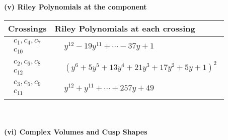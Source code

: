 \documentclass[1p]{elsarticle_modified}
\theoremstyle{definition}
\begin{document}
\newpage\renewcommand{\arraystretch}{1}
\flushleft \textbf{(v) Riley Polynomials at the component}\newline \\
\begin{tabular}{m{50pt}|m{274pt}}
Crossings & \hspace{64pt}Riley Polynomials at each crossing \\
\hline $$\begin{aligned}c_{1},c_{4},c_{7}\\c_{10}\end{aligned}$$&$\begin{aligned}
&y^{12}-19 y^{11}+\cdots-37 y+1
\end{aligned}$\\
\hline $$\begin{aligned}c_{2},c_{6},c_{8}\\c_{12}\end{aligned}$$&$\begin{aligned}
&(y^6+5 y^5+13 y^4+21 y^3+17 y^2+5 y+1)^2
\end{aligned}$\\
\hline $$\begin{aligned}c_{3},c_{5},c_{9}\\c_{11}\end{aligned}$$&$\begin{aligned}
&y^{12}+y^{11}+\cdots+257 y+49
\end{aligned}$\\
\hline
\end{tabular}\\~\\
\newpage\flushleft \textbf{(vi) Complex Volumes and Cusp Shapes}
\end{document}
